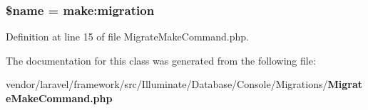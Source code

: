 \subsubsection[{\$name}]{\setlength{\rightskip}{0pt plus 5cm}\${\bf name} = \textquotesingle{}make\+:migration\textquotesingle{}\hspace{0.3cm}{\ttfamily [protected]}}\label{class_illuminate_1_1_database_1_1_console_1_1_migrations_1_1_migrate_make_command_ab2fc40d43824ea3e1ce5d86dee0d763b}


Definition at line 15 of file Migrate\+Make\+Command.\+php.



The documentation for this class was generated from the following file\+:\begin{DoxyCompactItemize}
\item 
vendor/laravel/framework/src/\+Illuminate/\+Database/\+Console/\+Migrations/{\bf Migrate\+Make\+Command.\+php}\end{DoxyCompactItemize}
